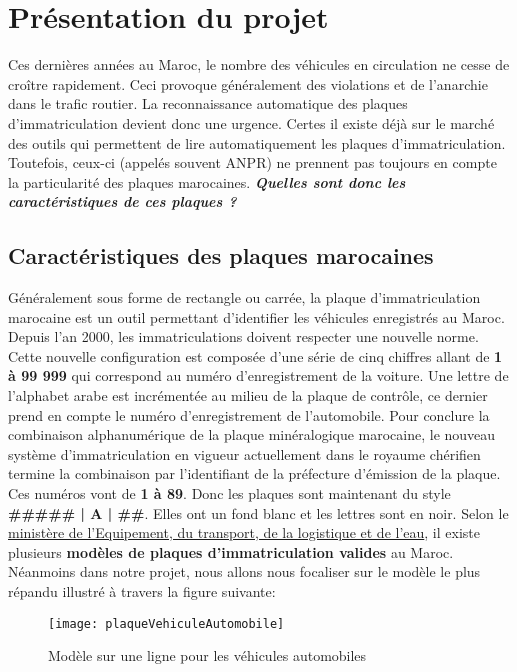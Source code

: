 \section{Présentation du projet}
Ces dernières années au Maroc, le nombre des véhicules en circulation ne cesse de croître rapidement. Ceci provoque généralement des violations et de l'anarchie dans le trafic routier. La reconnaissance automatique des plaques d’immatriculation devient donc une urgence. Certes il existe déjà sur le marché des outils qui permettent de lire automatiquement les plaques d’immatriculation. Toutefois, ceux-ci (appelés souvent ANPR) ne prennent pas toujours en compte la particularité des plaques marocaines. \textbf{\textit{Quelles sont donc les caractéristiques de ces plaques ?}}

    \subsection{Caractéristiques des plaques marocaines}
    Généralement sous forme de rectangle ou carrée, la plaque d’immatriculation marocaine est un outil permettant d’identifier les véhicules enregistrés au Maroc. Depuis l’an 2000, les immatriculations doivent respecter une nouvelle norme. Cette nouvelle configuration est composée d’une série de cinq chiffres allant de \textbf{1 à 99 999} qui correspond au numéro d’enregistrement de la voiture. Une lettre de l’alphabet arabe est incrémentée au milieu de la plaque de contrôle, ce dernier prend en compte le numéro d’enregistrement de l’automobile. Pour conclure la combinaison alphanumérique de la plaque minéralogique marocaine, le nouveau système d’immatriculation en vigueur actuellement dans le royaume chérifien termine la combinaison par l’identifiant de la préfecture d’émission de la plaque. Ces numéros vont de \textbf{1 à 89}. Donc les plaques sont maintenant du style \textbf{\#\#\#\#\# | A | \#\#}. Elles ont un fond blanc et les lettres sont en noir. Selon le \href{http://www.equipement.gov.ma/Transport-routier/Carte-grise/Pages/Differents-modeles-de-plaques-d-immatriculation-.aspx}{ministère de l'Equipement, du transport, de la logistique et de l'eau}, il existe plusieurs \textbf{modèles de plaques d'immatriculation valides} au Maroc. Néanmoins dans notre projet, nous allons nous focaliser sur le modèle le plus répandu illustré à travers la figure suivante:
        \begin{figure}[H]
            \centering
            \texttt{[image: plaqueVehiculeAutomobile]}
            \caption{Modèle sur une ligne pour les véhicules automobiles}
        \end{figure}
